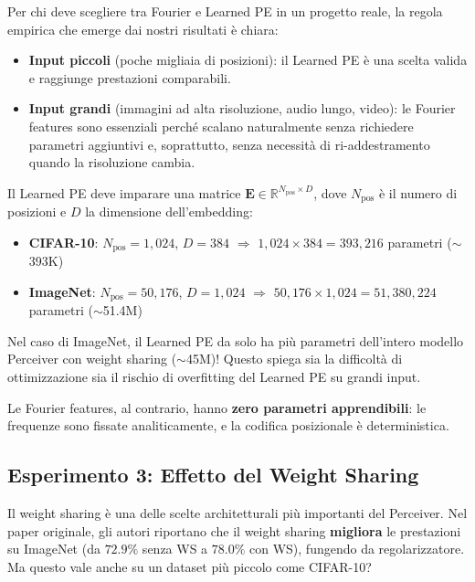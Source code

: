 \documentclass[12pt,a4paper]{article}
\begin{document}
Per chi deve scegliere tra Fourier e Learned PE in un progetto reale, la regola empirica che emerge dai nostri risultati \`e chiara:
\begin{itemize}
    \item \textbf{Input piccoli} (poche migliaia di posizioni): il Learned PE \`e una scelta valida e raggiunge prestazioni comparabili.
    \item \textbf{Input grandi} (immagini ad alta risoluzione, audio lungo, video): le Fourier features sono essenziali perch\'e scalano naturalmente senza richiedere parametri aggiuntivi e, soprattutto, senza necessit\`a di ri-addestramento quando la risoluzione cambia.
\end{itemize}

\begin{formulabox}
Il Learned PE deve imparare una matrice $\mathbf{E} \in \mathbb{R}^{N_{\text{pos}} \times D}$, dove $N_{\text{pos}}$ \`e il numero di posizioni e $D$ la dimensione dell'embedding:
\begin{itemize}
    \item \textbf{CIFAR-10}: $N_{\text{pos}} = 1{,}024$, $D = 384$ $\Rightarrow$ $1{,}024 \times 384 = 393{,}216$ parametri ($\sim$393K)
    \item \textbf{ImageNet}: $N_{\text{pos}} = 50{,}176$, $D = 1{,}024$ $\Rightarrow$ $50{,}176 \times 1{,}024 = 51{,}380{,}224$ parametri ($\sim$51.4M)
\end{itemize}
Nel caso di ImageNet, il Learned PE da solo ha pi\`u parametri dell'intero modello Perceiver con weight sharing ($\sim$45M)! Questo spiega sia la difficolt\`a di ottimizzazione sia il rischio di overfitting del Learned PE su grandi input.

Le Fourier features, al contrario, hanno \textbf{zero parametri apprendibili}: le frequenze sono fissate analiticamente, e la codifica posizionale \`e deterministica.
\end{formulabox}


\subsection{Esperimento 3: Effetto del Weight Sharing} \label{sec:exp_ws}

Il weight sharing \`e una delle scelte architetturali pi\`u importanti del Perceiver. Nel paper originale, gli autori riportano che il weight sharing \textbf{migliora} le prestazioni su ImageNet (da $72.9\%$ senza WS a $78.0\%$ con WS), fungendo da regolarizzatore. Ma questo vale anche su un dataset pi\`u piccolo come CIFAR-10?
\end{document}
